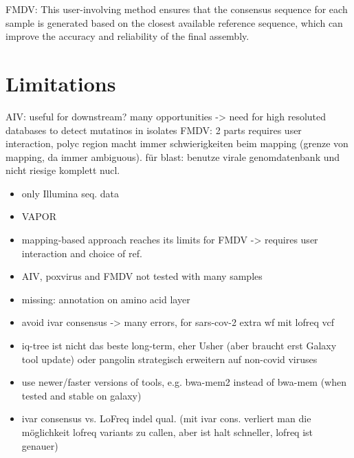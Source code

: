 

FMDV: This user-involving method ensures that the consensus sequence for each sample is generated based on the closest available reference sequence, which can improve the accuracy and reliability of the final assembly. 

\section{Limitations}
AIV: useful for downstream? many opportunities -> need for high resoluted databases to detect mutatinos in isolates
FMDV: 2 parts requires user interaction, polyc region macht immer schwierigkeiten beim mapping (grenze von mapping, da immer ambiguous). für blast: benutze virale genomdatenbank und nicht riesige komplett nucl.
\begin{itemize}
    \item only Illumina seq. data
    \item VAPOR 
    \item mapping-based approach reaches its limits for FMDV -> requires user interaction and choice of ref. 
    \item AIV, poxvirus and FMDV not tested with many samples
    \item missing: annotation on amino acid layer
    \item avoid ivar consensus -> many errors, for sars-cov-2 extra wf mit lofreq vcf
    \item iq-tree ist nicht das beste long-term, eher Usher (aber braucht erst Galaxy tool update) oder pangolin strategisch erweitern auf non-covid viruses
    \item use newer/faster versions of tools, e.g. bwa-mem2 instead of bwa-mem (when tested and stable on galaxy)
    \item ivar consensus vs. LoFreq indel qual. (mit ivar cons. verliert man die möglichkeit lofreq variants zu callen, aber ist halt schneller, lofreq ist genauer)
\end{itemize}

